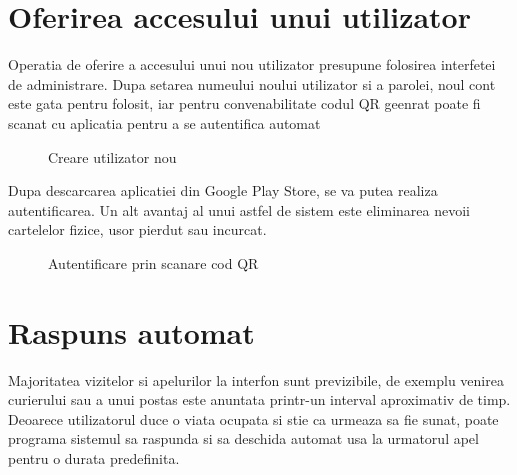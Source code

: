 \section{Oferirea accesului unui utilizator}

Operatia de oferire a accesului unui nou utilizator presupune folosirea interfetei de administrare. Dupa setarea numeului noului utilizator si a parolei, noul cont este gata pentru folosit, iar pentru convenabilitate codul QR geenrat poate fi scanat cu aplicatia pentru a se autentifica automat

\begin{figure}[H]
\begin{center}
  \hfil
  \caption{Creare utilizator nou}
  \label{fig:useradd}
\end{center}
\end{figure}

Dupa descarcarea aplicatiei din Google Play Store, se va putea realiza autentificarea. Un alt avantaj al unui astfel de sistem este eliminarea nevoii cartelelor fizice, usor pierdut sau incurcat.

\begin{figure}[H]
\begin{center}
  \hfil
  \caption{Autentificare prin scanare cod QR}
  \label{fig:androidqr}
\end{center}
\end{figure}

\section{Raspuns automat}

Majoritatea vizitelor si apelurilor la interfon sunt previzibile, de exemplu venirea curierului sau a unui postas este anuntata printr-un interval aproximativ de timp. Deoarece utilizatorul duce o viata ocupata si stie ca urmeaza sa fie sunat, poate programa sistemul sa raspunda si sa deschida automat usa la urmatorul apel pentru o durata predefinita.

